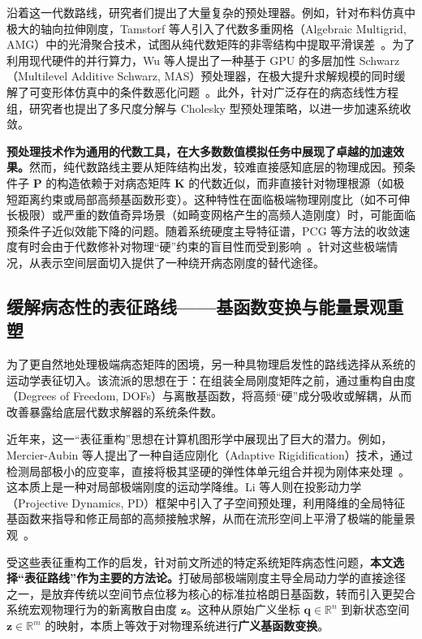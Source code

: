 沿着这一代数路线，研究者们提出了大量复杂的预处理器。例如，针对布料仿真中极大的轴向拉伸刚度，Tamstorf 等人引入了代数多重网格（Algebraic Multigrid, AMG）中的光滑聚合技术，试图从纯代数矩阵的非零结构中提取平滑误差~\cite{tamstorf2015smoothed}。为了利用现代硬件的并行算力，Wu 等人提出了一种基于 GPU 的多层加性 Schwarz（Multilevel Additive Schwarz, MAS）预处理器，在极大提升求解规模的同时缓解了可变形体仿真中的条件数恶化问题~\cite{wu2022gpu}。此外，针对广泛存在的病态线性方程组，研究者也提出了多尺度分解与 Cholesky 型预处理策略，以进一步加速系统收敛。

\textbf{预处理技术作为通用的代数工具，在大多数数值模拟任务中展现了卓越的加速效果。}然而，纯代数路线主要从矩阵结构出发，较难直接感知底层的物理成因。预条件子 $\mathbf{P}$ 的构造依赖于对病态矩阵 $\mathbf{K}$ 的代数近似，而非直接针对物理根源（如极短距离约束或局部高频基函数形变）。这种特性在面临极端物理刚度比（如不可伸长极限）或严重的数值奇异场景（如畸变网格产生的高频人造刚度）时，可能面临预条件子近似效能下降的问题。随着系统硬度主导特征谱，PCG 等方法的收敛速度有时会由于代数修补对物理“硬”约束的盲目性而受到影响~\cite{huang2025stiffgipc}。针对这些极端情况，从表示空间层面切入提供了一种绕开病态刚度的替代途径。

\subsection{缓解病态性的表征路线——基函数变换与能量景观重塑}

为了更自然地处理极端病态矩阵的困境，另一种具物理启发性的路线选择从系统的运动学表征切入。该流派的思想在于：在组装全局刚度矩阵之前，通过重构自由度（Degrees of Freedom, DOFs）与离散基函数，将高频“硬”成分吸收或解耦，从而改善暴露给底层代数求解器的系统条件数。

近年来，这一“表征重构”思想在计算机图形学中展现出了巨大的潜力。例如，Mercier-Aubin 等人提出了一种自适应刚化（Adaptive Rigidification）技术，通过检测局部极小的应变率，直接将极其坚硬的弹性体单元组合并视为刚体来处理~\cite{mercier2022adaptive}。这本质上是一种对局部极端刚度的运动学降维。Li 等人则在投影动力学（Projective Dynamics, PD）框架中引入了子空间预处理，利用降维的全局特征基函数来指导和修正局部的高频接触求解，从而在流形空间上平滑了极端的能量景观~\cite{li2023subspace}。

受这些表征重构工作的启发，针对前文所述的特定系统矩阵病态性问题，\textbf{本文选择“表征路线”作为主要的方法论。}打破局部极端刚度主导全局动力学的直接途径之一，是放弃传统以空间节点位移为核心的标准拉格朗日基函数，转而引入更契合系统宏观物理行为的新离散自由度 $\mathbf{z}$。这种从原始广义坐标 $\mathbf{q} \in \mathbb{R}^n$ 到新状态空间 $\mathbf{z} \in \mathbb{R}^m$ 的映射，本质上等效于对物理系统进行\textbf{广义基函数变换}。

